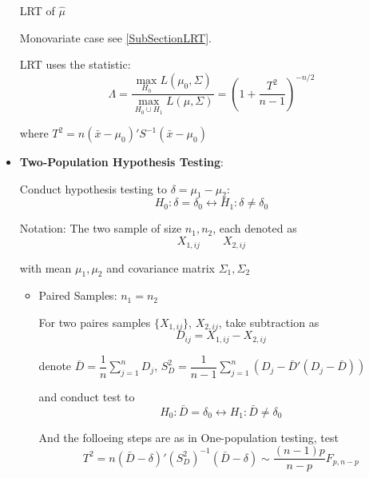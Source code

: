 \begin{itemize}[topsep=2pt,itemsep=2pt]
\begin{point}
    \hypertarget{PartHotellingT2Test}{LRT of $ \hat{\mu} $}
\end{point}

    Monovariate case see \autoref{SubSectionLRT}.

    LRT uses the statistic:
    \begin{equation}
        \Lambda =\dfrac{\max_{H_0 }L(\mu_0,\Sigma)}{\max_{H_0\cup H_1}L(\mu,\Sigma)}=(1+\dfrac{T^2}{n-1})^{-n/2} 
    \end{equation}

    where $ T^2=n(\bar{x}-\mu_0)'S^{-1}(\bar{x}-\mu_0) $
    
\item \textbf{Two-Population Hypothesis Testing}:

    Conduct hypothesis testing to $ \delta =\mu _1-\mu _2 $:
\begin{equation}
    H_0: \delta =\delta _0\longleftrightarrow H_1:\delta \neq \delta _0
\end{equation}

    Notation: The two sample of size $ n_1,n_2 $, each denoted as
    \begin{equation}
        X_{1,ij}\qquad X_{2,ij} 
    \end{equation}
    
    with mean $ \mu_1,\mu_2 $ and covariance matrix $ \Sigma_1,\Sigma_2 $

    \begin{itemize}[topsep=2pt,itemsep=2pt]
        \item Paired Samples: $ n_1=n_2 $
        
        For two paires samples $ \{X_{1,ij}\} $, $ X_{2,ij} $, take subtraction as 
        \begin{equation}
            D_{ij}=X_{1,ij}-X_{2,ij} 
        \end{equation}

        denote $ \bar{D}=\dfrac{1}{n}\sum_{j=1}^nD_{ j} $, $ S^2_D=\dfrac{1}{n-1}\sum_{j=1}^n(D_j-\bar{D}'(D_j-\bar{D})) $
        
        and conduct test to 
        \begin{equation}
            H_0: \bar{D} =\delta _0\longleftrightarrow H_1:\bar{D} \neq \delta _0
        \end{equation}

        And the folloeing steps are as in One-population testing, test
        \begin{equation}
            T^2=n(\bar{D}-\delta )'(S^2_D)^{-1}(\bar{D}-\delta )\sim \dfrac{(n-1)p}{n-p}F_{p,n-p}
        \end{equation}
        

\end{itemize}
\end{itemize}
